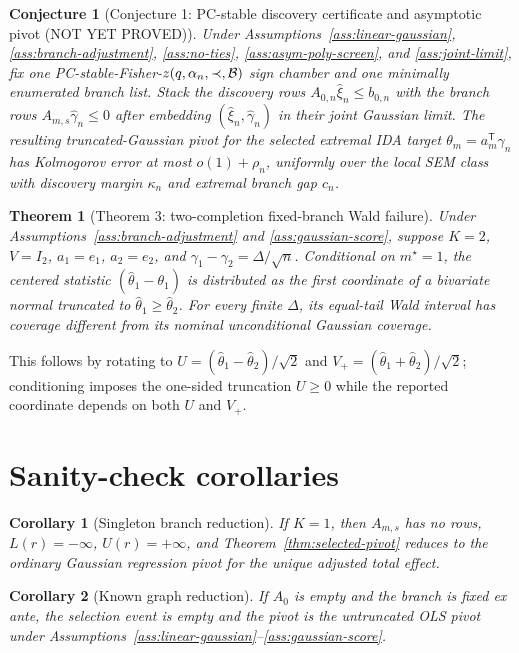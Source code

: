 \documentclass[11pt]{article}
\newcommand{\transpose}{\mathsf{T}}
\theoremstyle{definition}
\theoremstyle{plain}
\newtheorem{theorem}{Theorem}
\newtheorem{conjecture}{Conjecture}
\newtheorem{corollary}{Corollary}
\theoremstyle{remark}
\begin{document}
\begin{conjecture}[Conjecture 1: PC-stable discovery certificate and asymptotic pivot (NOT YET PROVED)]\label{conj:asym-discovery}
Under Assumptions~\ref{ass:linear-gaussian}, \ref{ass:branch-adjustment}, \ref{ass:no-ties}, \ref{ass:asym-poly-screen}, and \ref{ass:joint-limit}, fix one PC-stable-Fisher-\(z(q,\alpha_n,\prec,{\cal B})\) sign chamber and one minimally enumerated branch list. Stack the discovery rows \(A_{0,n}\hat\xi_n\le b_{0,n}\) with the branch rows \(A_{m,s}\hat\gamma_n\le0\) after embedding \((\hat\xi_n,\hat\gamma_n)\) in their joint Gaussian limit. The resulting truncated-Gaussian pivot for the selected extremal IDA target \(\theta_m=a_m^\transpose\gamma_n\) has Kolmogorov error at most \(o(1)+\rho_n\), uniformly over the local SEM class with discovery margin \(\kappa_n\) and extremal branch gap \(c_n\).
\end{conjecture}

\begin{theorem}[Theorem 3: two-completion fixed-branch Wald failure]\label{thm:wald-failure}
Under Assumptions~\ref{ass:branch-adjustment} and \ref{ass:gaussian-score}, suppose \(K=2\), \(V=I_2\), \(a_1=e_1\), \(a_2=e_2\), and \(\gamma_1-\gamma_2=\Delta/\sqrt n\). Conditional on \(m^\star=1\), the centered statistic \((\hat\theta_1-\theta_1)\) is distributed as the first coordinate of a bivariate normal truncated to \(\hat\theta_1\ge\hat\theta_2\). For every finite \(\Delta\), its equal-tail Wald interval has coverage different from its nominal unconditional Gaussian coverage.
\end{theorem}
This follows by rotating to \(U=(\hat\theta_1-\hat\theta_2)/\sqrt2\) and \(V_+=(\hat\theta_1+\hat\theta_2)/\sqrt2\); conditioning imposes the one-sided truncation \(U\ge0\) while the reported coordinate depends on both \(U\) and \(V_+\).

\section{Sanity-check corollaries}
\begin{corollary}[Singleton branch reduction]\label{cor:singleton}
If \(K=1\), then \(A_{m,s}\) has no rows, \(L(r)=-\infty\), \(U(r)=+\infty\), and Theorem~\ref{thm:selected-pivot} reduces to the ordinary Gaussian regression pivot for the unique adjusted total effect.
\end{corollary}

\begin{corollary}[Known graph reduction]\label{cor:known-graph}
If \(A_0\) is empty and the branch is fixed ex ante, the selection event is empty and the pivot is the untruncated OLS pivot under Assumptions~\ref{ass:linear-gaussian}--\ref{ass:gaussian-score}.
\end{corollary}
\end{document}
